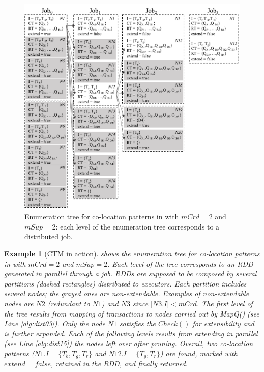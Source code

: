 \documentclass[preprint,12pt,authoryear]{elsarticle} %
\renewcommand{\sf}[1]{\textsf{\textup{#1}}}
\newtheorem{example}{Example}
\begin{document}
\begin{figure}[t]
\centering
\includegraphics[scale=.5]{ctm.pdf}
\caption{Enumeration tree for co-location patterns in  with $mCrd=2$ and $mSup=2$: each level of the enumeration tree corresponds to a distributed job.}
\label{fig:ctminaction}
\end{figure}
\begin{example}[CTM in action]
 shows the enumeration tree for co-location patterns in  with $mCrd=2$ and $mSup=2$.
Each level of the tree corresponds to an RDD generated in parallel through a job.
RDDs are supposed to be composed by several partitions (dashed rectangles) distributed to executors.
Each partition includes several nodes; the grayed ones are non-extendable.
Examples of non-extendable nodes are $N2$ (redundant to $N1$) and $N3$ since $|N3.I| < mCrd$.
The first level of the tree results from mapping of transactions to nodes carried out by \sf{MapQ()} (see  Line \ref{alg:dist03}).
Only the node $N1$ satisfies the $Check()$ for extensibility and is further expanded.
Each of the following levels results from extending in parallel (see  Line \ref{alg:dist15}) the nodes left over after pruning.
Overall, two co-location patterns ($N1.I = \{T_b, T_g, T_r\}$ and $N12.I = \{T_g,T_r\}$) are found, marked with $extend=false$, retained in the RDD, and finally returned.
\end{example}
\end{document}
